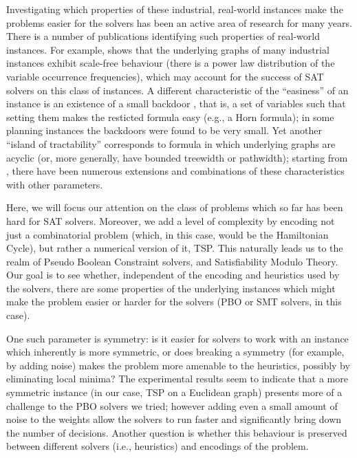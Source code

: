 \documentclass{llncs}
\begin{document}
Investigating which properties of these industrial, real-world instances make the problems easier for the solvers has been an active area of research for many years.  There is a number of publications identifying such properties of real-world instances.  For example, \cite{ABL09} shows that the underlying graphs of many industrial instances exhibit   scale-free behaviour (there is a power law distribution of the variable occurrence frequencies), which may account for the success of SAT solvers on this class of instances. A different characteristic of the ``easiness'' of an instance is an existence of a small backdoor \cite{WGS03}, that is, a set of variables such that setting them makes the resticted formula easy (e.g., a Horn formula); in some planning instances the backdoors were found to be very small. Yet another ``island of tractability'' corresponds to formula in which underlying graphs are acyclic (or, more generally, have bounded treewidth or pathwidth); starting from \cite{Fre85,DP89}, there have been numerous extensions and combinations of these characteristics with other parameters. 

Here, we will focus our attention on the class of problems which so far has been hard for SAT solvers. Moreover, we add a level of complexity by encoding not just a combinatorial   problem (which, in this case, would be the Hamiltonian Cycle), but rather a numerical version of it, TSP.  This naturally leads us to the realm of Pseudo Boolean Constraint solvers, and Satisfiability Modulo Theory. Our goal is to see whether, independent of the encoding and heuristics used by the solvers, there are some properties of the underlying instances  which might make the problem easier or harder for the solvers (PBO or SMT solvers, in this case).  

One such parameter is symmetry: is it easier for solvers to work with an instance which inherently is more symmetric, or does breaking a symmetry (for example, by adding noise) makes the problem more amenable to the heuristics, possibly by eliminating local minima?   The experimental results seem to indicate that a more symmetric instance (in our case, TSP on a Euclidean graph) presents more of a challenge to the PBO solvers we tried; however adding even a small amount of noise to the weights allow the solvers to run faster and significantly bring down the number of decisions. Another question is whether this behaviour is preserved between different solvers (i.e., heuristics) and encodings  of the problem. 
\end{document}
